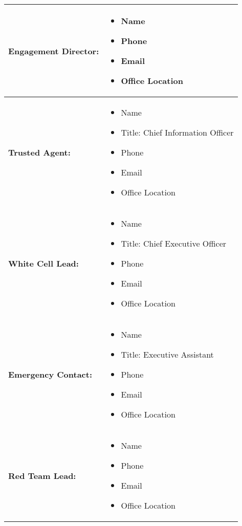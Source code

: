 \documentclass[12pt,letterpaper]{article}
\begin{document}
\begin{tabularx}{\textwidth}{|l|X|}
    \hline
    \textbf{Engagement Director:} & 
    \begin{itemize}[leftmargin=*]
        \item Name
        \item Phone
        \item Email
        \item Office Location
    \end{itemize} \\
    \hline
    \textbf{Trusted Agent:} & 
    \begin{itemize}[leftmargin=*]
        \item Name
        \item Title: Chief Information Officer
        \item Phone
        \item Email
        \item Office Location
    \end{itemize} \\
    \hline
    \textbf{White Cell Lead:} & 
    \begin{itemize}[leftmargin=*]
        \item Name
        \item Title: Chief Executive Officer
        \item Phone
        \item Email
        \item Office Location
    \end{itemize} \\
    \hline
    \textbf{Emergency Contact:} & 
    \begin{itemize}[leftmargin=*]
        \item Name
        \item Title: Executive Assistant
        \item Phone
        \item Email
        \item Office Location
    \end{itemize} \\
    \hline
    \textbf{Red Team Lead:} & 
    \begin{itemize}[leftmargin=*]
        \item Name
        \item Phone
        \item Email
        \item Office Location
    \end{itemize} \\
    \hline
\end{tabularx}
\end{document}
